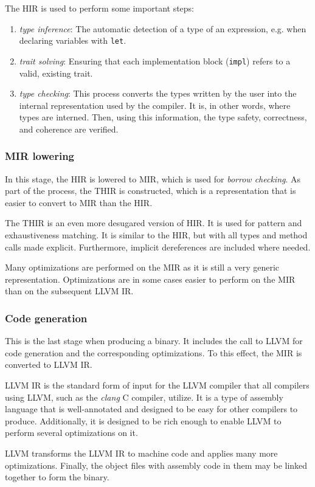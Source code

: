\documentclass[../Thesis.tex]{subfiles}
\begin{document}
The \acrshort{HIR} is used to perform some important steps:

\begin{enumerate}
      \item \emph{type inference}: The automatic detection of a type
            of an expression, e.g. when declaring variables with \texttt{let}.
      \item \emph{trait solving}: Ensuring that each implementation block (\texttt{impl})
            refers to a valid, existing trait.
      \item \emph{type checking}: This process converts the types written by the user
            into the internal representation used by the compiler.
            It is, in other words, where types are interned.
            Then, using this information, the type safety, correctness, and coherence are verified.
\end{enumerate}

\subsubsection{MIR lowering}

In this stage, the \acrshort{HIR} is lowered to \acrfull{MIR},
which is used for \emph{borrow checking}.
As part of the process, the \acrfull{THIR} is constructed,
which is a representation that is easier to convert to \acrshort{MIR} than the \acrshort{HIR}.

The \acrshort{THIR} is an even more desugared version of \acrshort{HIR}.
It is used for pattern and exhaustiveness matching.
It is similar to the \acrshort{HIR}, but with all types and method calls made explicit.
Furthermore, implicit dereferences are included where needed.

Many optimizations are performed on the \acrshort{MIR}
as it is still a very generic representation.
Optimizations are in some cases easier
to perform on the \acrshort{MIR} than on the subsequent LLVM \acrshort{IR}.

\subsubsection{Code generation}

This is the last stage when producing a binary.
It includes the call to LLVM for code generation
and the corresponding optimizations.
To this effect, the \acrshort{MIR} is converted to LLVM \acrshort{IR}.

LLVM \acrshort{IR} is the standard form of input for the LLVM compiler
that all compilers using LLVM, such as the \emph{clang} C compiler, utilize.
It is a type of assembly language that is well-annotated
and designed to be easy for other compilers to produce.
Additionally, it is designed to be rich enough to enable LLVM
to perform several optimizations on it.

LLVM transforms the LLVM \acrshort{IR} to machine code
and applies many more optimizations.
Finally, the object files with assembly code in them may be
linked together to form the binary.
\end{document}
